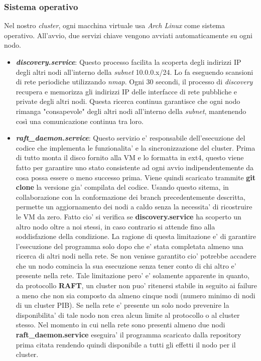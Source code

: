 \subsubsection{Sistema operativo}
Nel nostro \textit{cluster}, ogni macchina virtuale usa \textit{Arch Linux} come 
sistema operativo. 
All'avvio, due servizi chiave vengono avviati automaticamente su ogni nodo.
\begin{itemize}
    \item \textit{\textbf{discovery.service}}: Questo processo facilita la scoperta degli indirizzi IP degli altri nodi all'interno della \textit{subnet} 10.0.0.x/24. Lo fa eseguendo scansioni di rete periodiche utilizzando 
        \textit{nmap}. Ogni 30 secondi, il processo di \textit{discovery} recupera e memorizza gli indirizzi IP delle interfacce di rete pubbliche e private degli altri nodi. Questa ricerca continua garantisce che ogni nodo 
        rimanga "consapevole" degli altri nodi all'interno della \textit{subnet}, mantenendo così una comunicazione continua tra loro.
  \item \textit{\textbf{raft\_daemon.service}}: 
        Questo servizio e' responsabile dell'esecuzione del codice che implementa le funzionalita' 
        e la sincronizzazione del cluster. Prima di tutto monta il disco fornito alla VM e lo formatta
        in ext4, questo viene fatto per garantire uno stato consistente ad ogni avvio 
        indipendentemente da cosa possa essere o meno successo prima.
        Viene quindi scaricato trammite \textbf{git clone} la versione gia' compilata del codice.
        Usando questo sitema, in collaborazione con la conformazione dei branch precedentemente
        descritta, permette un aggiornamento dei nodi a caldo senza la necessita' di ricostruire
        le VM da zero. Fatto cio' si verifica se \textbf{discovery.service} ha scoperto un altro 
        nodo oltre a noi stessi, in caso contrario si attende fino alla soddisfazione della condizione.
        La ragione di questa limitazione e' di garantire l'esecuzione del programma solo dopo 
        che e' stata completata almeno una ricerca di altri nodi nella rete.
        Se non venisse garantito cio' potrebbe accadere che un nodo comincia la sua esecuzione senza
        tener conto di chi altro e' presente nella rete.
        Tale limitazione pero' e' solamente apparente in quanto, da protocollo \textbf{RAFT}, 
        un cluster non puo' ritenersi stabile in seguito ai failure a meno che non sia composto da 
        almeno cinque nodi (numero minimo di nodi di un cluster PIB). Se nella rete
        e' presente un solo nodo prevenire la disponibilita' di tale nodo non crea alcun limite
        al protocollo o al cluster stesso. Nel momento in cui nella rete sono presenti almeno due
        nodi \textbf{raft\_daemon.service} eseguira' il programma scaricato dalla repository prima
        citata rendendo quindi disponibile a tutti gli effetti il nodo per il cluster.
\end{itemize}



